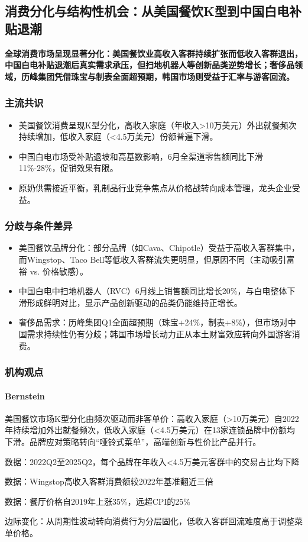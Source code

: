 \documentclass[11pt]{ctexart}
\begin{document}
\subsection{消费分化与结构性机会：从美国餐饮K型到中国白电补贴退潮}
\textbf{全球消费市场呈现显著分化：美国餐饮业高收入客群持续扩张而低收入客群退出，中国白电补贴退潮后真实需求承压，但扫地机器人等创新品类逆势增长；奢侈品领域，历峰集团凭借珠宝与制表全面超预期，韩国市场则受益于汇率与游客回流。}
\subsubsection*{主流共识}
\begin{itemize}
  \item 美国餐饮消费呈现K型分化，高收入家庭（年收入>10万美元）外出就餐频次持续增加，低收入家庭（<4.5万美元）份额普遍下滑。
  \item 中国白电市场受补贴退坡和高基数影响，6月全渠道零售额同比下滑11\%-28\%，促销效果有限。
  \item 原奶供需接近平衡，乳制品行业竞争焦点从价格战转向成本管理，龙头企业受益。
\end{itemize}
\subsubsection*{分歧与条件差异}
\begin{itemize}
  \item 美国餐饮品牌分化：部分品牌（如Cava、Chipotle）受益于高收入客群集中，而Wingstop、Taco Bell等低收入客群流失更明显，但原因不同（主动吸引富裕 vs. 价格敏感）。
  \item 中国白电中扫地机器人（RVC）6月线上销售额同比增长20\%，与白电整体下滑形成鲜明对比，显示产品创新驱动的品类仍能维持正增长。
  \item 奢侈品需求：历峰集团Q1全面超预期（珠宝+24\%，制表+8\%），但市场对中国需求持续性仍有分歧；韩国市场增长动力正从本土财富效应转向外国游客消费。
\end{itemize}
\subsubsection*{机构观点}
\paragraph{Bernstein} 美国餐饮市场K型分化由频次驱动而非客单价：高收入家庭（>10万美元）自2022年持续增加外出就餐频次，低收入家庭（<4.5万美元）在13家连锁品牌中份额均下滑。品牌应对策略转向“哑铃式菜单”，高端创新与性价比产品并行。
{\small\color{refgray}数据：2022Q2至2025Q2，每个品牌在年收入<4.5万美元客群中的交易占比均下降\par}
{\small\color{refgray}数据：Wingstop高收入客群消费额较2022年基准翻近三倍\par}
{\small\color{refgray}数据：餐厅价格自2019年上涨35\%，远超CPI的25\%\par}
{\small\color{refgray}边际变化：从周期性波动转向消费行为分层固化，低收入客群回流难度高于调整菜单价格。\par}
\end{document}
